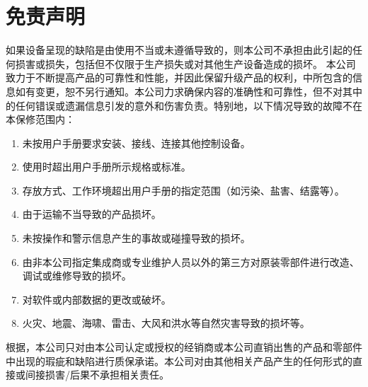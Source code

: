 \section{免责声明}
如果设备呈现的缺陷是由{\User}使用不当或未遵循{\ThisBook}导致的，则本公司不承担由此引起的任何损害或损失，包括但不仅限于生产损失或对其他生产设备造成的损坏。
本公司致力于不断提高产品的可靠性和性能，并因此保留升级产品的权利，{\ThisBook}中所包含的信息如有变更，恕不另行通知。本公司力求确保{\ThisBook}内容的准确性和可靠性，但不对其中的任何错误或遗漏信息引发的意外和伤害负责。特别地，以下情况导致的故障不在本保修范围内：
\begin{enumerate}
\item 未按用户手册要求安装、接线、连接其他控制设备。
\item 使用时超出用户手册所示规格或标准。
\item 存放方式、工作环境超出用户手册的指定范围（如污染、盐害、结露等）。
\item 由于运输不当导致的产品损坏。
\item 未按操作和警示信息产生的事故或碰撞导致的损坏。
\item 由非本公司指定集成商或专业维护人员以外的第三方对原装零部件进行改造、调试或维修导致的损坏。
\item 对软件或内部数据的更改或破坏。
\item 火灾、地震、海啸、雷击、大风和洪水等自然灾害导致的损坏等。
\end{enumerate}

根据，本公司只对由本公司认定或授权的经销商或本公司直销出售的产品和零部件中出现的瑕疵和缺陷进行质保承诺。本公司对由其他相关产品产生的任何形式的直接或间接损害/后果不承担相关责任。
